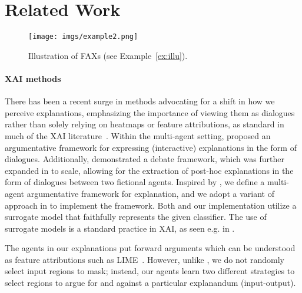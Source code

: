 \section{Related Work}
\label{sec:related_Work}
\begin{figure}
    \centering  \texttt{[image: imgs/example2.png]}
    \caption{
    Illustration of FAXs (see Example~\ref{ex:illu}). }
    \label{fig:example}
    \vspace{-10pt}
\end{figure}

\paragraph{XAI methods} 
There has been a recent surge in methods advocating for a shift in how we perceive explanations, emphasizing the importance of viewing them as dialogues rather than solely relying on heatmaps or feature attributions, as %
standard in much of the XAI literature~\cite{miller2019explanation,madumal2019grounded,lakkaraju2022rethinking}. 
Within the multi-agent setting,
\cite{Rago_23} proposed an argumentative framework for expressing (interactive) explanations in the form of dialogues. 
Additionally, \cite{debate} demonstrated a debate framework, which was further expanded in \cite{kori2022explaining} to scale, allowing for the extraction of post-hoc explanations in the form of dialogues between two fictional %
agents.
Inspired by \cite{Rago_23}, we define a multi-agent argumentative framework for explanation, 
and we adopt a variant of approach in \cite{kori2022explaining} to implement the framework.
%
Both \cite{kori2022explaining} and our implementation utilize a surrogate model that faithfully represents the given classifier. 
The use of surrogate models is a standard practice in XAI, as seen e.g. in \cite{yoon2018invase,goyal2019counterfactual,glance}.

 
The agents in our explanations put forward arguments which can be understood as feature attributions such as 
LIME~\cite{lime}.
However, unlike \cite{lime}, we do not randomly select input regions to mask; instead, %
our agents learn two different strategies to select regions to argue for and against a particular explanandum (input-output).

